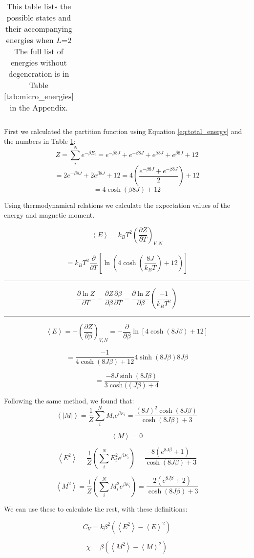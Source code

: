 \begin{table}[H]
	\caption{This table lists the possible states and their accompanying energies when $L$=2 The full list of energies without degeneration is in Table \ref{tab:micro_energies} in the Appendix.}
	\label{tab:macro_energies}
\begin{tabular}{cccccc}
	
\end{tabular}
\end{table}

First we calculated the partition function using Equation \ref{eq:total_energy} and the numbers in Table \ref{tab:macro_energies}:
\[
Z = \sum_i^N e^{-\beta E_i} = e^{-\beta 8 J} + e^{-\beta 8 J} + e^{\beta 8 J}+e^{\beta 8 J} + 12
\]
\[
= 2e^{-\beta 8 J}+ 2e^{\beta 8 J} + 12 = 4\left(\frac{e^{-\beta 8 J}+ e^{-\beta 8 J}}{2}\right)+12
\]
\[
= 4 \cosh\left( \beta 8 J \right) + 12
\]

Using thermodynamical relations we calculate the expectation values of the energy and magnetic moment\cite{thermal}.

\[
\left< E \right> = k_B T^2 \left(\frac{\partial Z}{\partial T}
\right)_{V,N}
\]

\[
= k_B T^2 \frac{\partial}{\partial T} \left[\ln \left(4\cosh \left(\frac{8J}{k_BT}\right) +12\right) \right]\]
\hrule
\[
\frac{\partial \ln Z}{\partial T} = \frac{\partial Z}{\partial \beta}\frac{\partial \beta}{\partial T} = \frac{\partial \ln Z}{\partial \beta}\left(\frac{-1}{k_B T^2}\right)
\]
\hrule
\[
\left< E\right> = -\left(\frac{\partial Z}{\partial \beta} \right)_{V,N} = - \frac{\partial}{\partial \beta} \ln \left[ 4 \cosh \left( 8J\beta\right)+12\right]
\]

\[
= \frac{-1}{4\cosh (8J\beta) + 12}4 \sinh(8J\beta)8J\beta
\]

\[
= \frac{-8J \sinh(8J\beta)}{3\cosh((J\beta)+ 4}
\]

Following the same method, we found that:
\[
\left< |M| \right> = \frac{1}{Z} \sum_i^N M_i e^{\beta E_i}  = \frac{(8J)^2 \cosh(8J\beta )}{\cosh (8J\beta ) + 3}
\]

\[
\left< M \right> = 0
\]

\[
\left< E^2 \right> = \frac{1}{Z} \left( \sum_i^N E_i^2 e^{\beta E_i}\right) =\frac{8 \left( e^{8J\beta } + 1\right) }{\cosh (8J\beta ) + 3}
\]


\[
\left< M^2 \right> = \frac{1}{Z} \left( \sum_i^N M_i^2 e^{\beta E_i}\right) = \frac{2 \left( e^{8J\beta } + 2\right) }{\cosh (8J\beta ) + 3}
\]

We can use these to calculate the rest, with these definitions:

\[
C_V = k \beta^2\left( \left< E^2\right> - \left< E\right>^2 \right)
\]

\[
\chi = \beta \left( \left< M^2\right> - \left< M\right>^2\right)
\]